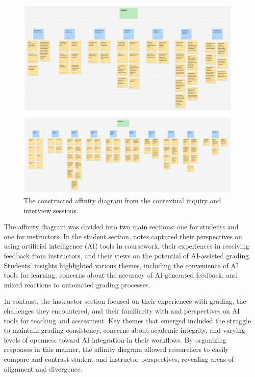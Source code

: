 \documentclass[sigconf,natbib=true]{acmart}
\begin{document}
\begin{figure}[h]
  \centering
  \includegraphics[width=\linewidth]{affinity_diagram.png}
  \caption{The constructed affinity diagram from the contextual inquiry and interview sessions.}\label{fig:affinity}
\end{figure}

The affinity diagram was divided into two main sections: one for students and one for instructors. In the student section, notes captured their perspectives on using artificial intelligence (AI) tools in coursework, their experiences in receiving feedback from instructors, and their views on the potential of AI-assisted grading. Students' insights highlighted various themes, including the convenience of AI tools for learning, concerns about the accuracy of AI-generated feedback, and mixed reactions to automated grading processes.

In contrast, the instructor section focused on their experiences with grading, the challenges they encountered, and their familiarity with and perspectives on AI tools for teaching and assessment. Key themes that emerged included the struggle to maintain grading consistency, concerns about academic integrity, and varying levels of openness toward AI integration in their workflows. By organizing responses in this manner, the affinity diagram allowed researchers to easily compare and contrast student and instructor perspectives, revealing areas of alignment and divergence.
\end{document}
